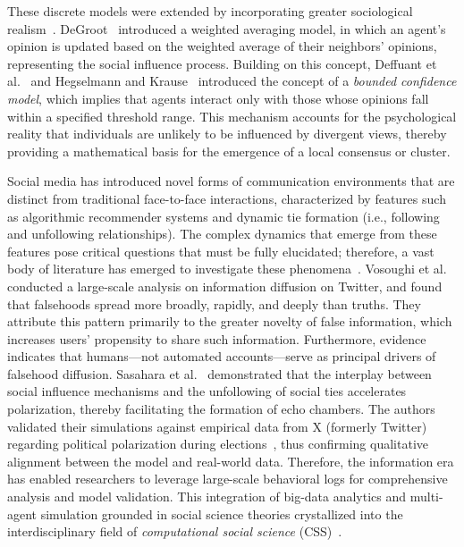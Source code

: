 \documentclass[pdflatex,sn-mathphys-num]{sn-jnl}%
\theoremstyle{thmstyleone}%
\theoremstyle{thmstyletwo}%
\theoremstyle{thmstylethree}%
\begin{document}
These discrete models were extended by incorporating greater
sociological realism~\cite{DeGroot1974,Friedkin1990,Deffuant2000,Hegselmann2002}. DeGroot~\cite{DeGroot1974} introduced a weighted
averaging model, in which an agent's opinion is updated based on the
weighted average of their neighbors' opinions, representing the
social influence process. Building on this concept, Deffuant et al.~\cite{Deffuant2000} and Hegselmann and Krause~\cite{Hegselmann2002}
introduced the concept of a \emph{bounded confidence model}, which
implies that agents interact only with those whose opinions fall
within a specified threshold range. This mechanism accounts for 
the psychological reality that individuals are unlikely to be influenced
by divergent views, thereby providing a mathematical basis for the emergence
of a local consensus or cluster.
\par



Social media has introduced novel forms of communication
environments that are distinct from traditional face-to-face interactions,
characterized by features such as algorithmic recommender systems and
dynamic tie formation (i.e., following and unfollowing
relationships). The complex dynamics that emerge from these features pose
critical questions that must be fully elucidated; therefore, a
vast body of literature has emerged to investigate these
phenomena~\cite{Watts2007,Lazer2009,Golder2011,Bond2012,Bakshy2015,DelVicario2016,Vosoughi2018,Sasahara2021,Conover2011}. Vosoughi
et al.~\cite{Vosoughi2018} conducted a large-scale analysis on
information diffusion on Twitter, and found that falsehoods spread more
broadly, rapidly, and deeply than truths. They attribute this pattern 
primarily to the greater novelty of false information, which increases
users’ propensity to share such information. Furthermore, evidence indicates
that humans---not automated accounts---serve as principal drivers
of falsehood diffusion. Sasahara et al.~\cite{Sasahara2021}
demonstrated that the interplay between social influence mechanisms
and the unfollowing of social ties accelerates polarization, thereby facilitating
the formation of echo chambers. The authors validated their simulations
against empirical data from X (formerly Twitter) regarding
political polarization during elections~\cite{Conover2011}, thus confirming
qualitative alignment between the model and real-world data. Therefore,
the information era has enabled researchers to leverage large-scale
behavioral logs for comprehensive analysis and model validation. This integration of
big-data analytics and multi-agent simulation grounded in
social science theories crystallized into the interdisciplinary
field of \emph{computational social science} (CSS)~\cite{Lazer2009}.
\par
\end{document}
